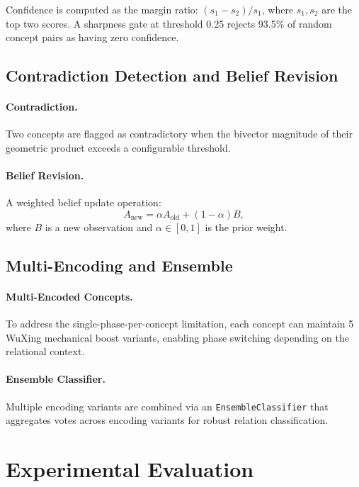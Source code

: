 \documentclass[11pt,a4paper]{article}
\begin{document}
Confidence is computed as the margin ratio: $(s_1 - s_2) / s_1$, where
$s_1, s_2$ are the top two scores. A sharpness gate at threshold 0.25 rejects
93.5\% of random concept pairs as having zero confidence.

\subsection{Contradiction Detection and Belief Revision}

\paragraph{Contradiction.} Two concepts are flagged as contradictory when the
bivector magnitude of their geometric product exceeds a configurable threshold.

\paragraph{Belief Revision.} A weighted belief update operation:
\begin{equation}
  A_{\text{new}} = \alpha A_{\text{old}} + (1 - \alpha) B,
\end{equation}
where $B$ is a new observation and $\alpha \in [0, 1]$ is the prior weight.

\subsection{Multi-Encoding and Ensemble}

\paragraph{Multi-Encoded Concepts.} To address the single-phase-per-concept
limitation, each concept can maintain 5 WuXing mechanical boost variants,
enabling phase switching depending on the relational context.

\paragraph{Ensemble Classifier.} Multiple encoding variants are combined via
an \texttt{EnsembleClassifier} that aggregates votes across encoding variants
for robust relation classification.

\section{Experimental Evaluation}
\label{sec:results}
\end{document}
